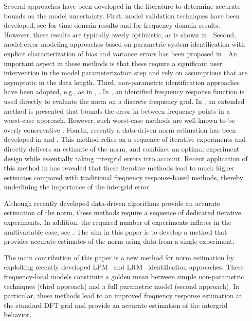Several approaches have been developed in the literature to determine accurate bounds on the model uncertainty. First, model validation techniques have been developed, see \cite{Poolla1994} for time domain results and \cite{Smith1992} for frequency domain results. 
However, these results are typically overly optimistic, as is shown in \cite{Oomen2009UncEstim}. 
Second, model-error-modeling approaches based on parametric system identification with explicit characterization of bias and variance errors has been proposed in \cite{Ljung1999MEM}. 
An important aspect in these methods is that these require a significant user intervention in the model parameterization step and rely on assumptions that are asymptotic in the data length. 
Third, non-parametric identification approaches have been adopted, e.g., as in , . 
In , an identified frequency response function is used directly to evaluate the \Hinf{} norm on a discrete frequency grid. In , an extended method is presented that bounds the error in between frequency points in a worst-case approach. 
However, such worst-case methods are well-known to be overly conservative \cite[Section 9.5.2]{Vinnicombe2001}. Fourth, recently a data-driven \Hinf{} norm estimation has been developed in \cite{Wahlberg2010} and \cite{Oomen2014ILH}. 
This method relies on a sequence of iterative experiments and directly delivers an estimate of the \Hinf{} norm, and combines an optimal experiment design while essentially taking intergrid errors into account.
Recent application of this method in \cite{Oomen2014ILH} has revealed that these iterative methods lead to much higher \Hinf{} estimates compared with traditional frequency response-based methods, thereby underlining the importance of the intergrid error.

Although recently developed data-driven algorithms provide an accurate estimation of the \Hinf{} norm, these methods require a sequence of dedicated iterative experiments. 
In addition, the required number of experiments inflates in the multivariable case, see \cite{Oomen2014ILH}. 
The aim in this paper is to develop a method that provides accurate estimates of the \Hinf{} norm using data from a single experiment. 

The main contribution of this paper is a new method for \Hinf{} norm estimation by exploiting recently developed \gls{LPM}~\citep{Schoukens2009LPM} and \gls{LRM}~\citep{McKelvey2012LRM} identification approaches.
These frequency-local models constitute a golden mean between simple non-parametric techniques (third approach) and a full parametric model (second approach). 
In particular, these methods lead to an improved frequency response estimation at the standard \gls{DFT} grid and provide an accurate estimation of the intergrid behavior. 

